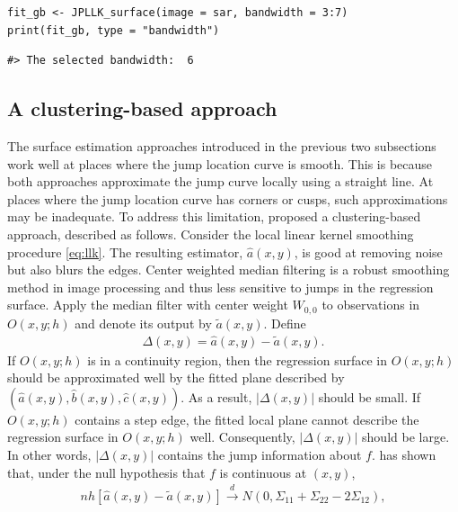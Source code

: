 \begin{verbatim}
fit_gb <- JPLLK_surface(image = sar, bandwidth = 3:7)
print(fit_gb, type = "bandwidth")
\end{verbatim}

\begin{verbatim}
#> The selected bandwidth:  6
\end{verbatim}

\subsection{A clustering-based approach}\label{sec:denoise.cluster}

The surface estimation approaches introduced in the previous two subsections work well at places where the jump location curve is smooth. This is because both approaches approximate the jump curve locally using a straight line. At places where the jump location curve has corners or cusps, such approximations may be inadequate. To address this limitation, \citet{kang2018efficient} proposed a clustering-based approach, described as follows. Consider the local linear kernel smoothing procedure \eqref{eq:llk}. The resulting estimator, \(\widehat{a}(x, y)\), is good at removing noise but also blurs the edges. Center weighted median filtering \citep{ko1991center, sun1994center} is a robust smoothing method in image processing and thus less sensitive to jumps in the regression surface. Apply the median filter with center weight \(W_{0, 0}\) to observations in \(O(x, y; h)\) and denote its output by \(\tilde{a}(x, y)\). Define
\begin{align*}
  \Delta(x, y) = \widehat{a}(x, y) - \tilde{a}(x, y).
\end{align*}
If \(O(x, y; h)\) is in a continuity region, then the regression surface in \(O(x, y; h)\) should be approximated well by the fitted plane described by \((\widehat{a}(x, y), \widehat{b}(x, y), \widehat{c}(x, y))\). As a result, \(| \Delta(x, y) |\) should be small. If \(O(x, y; h)\) contains a step edge, the fitted local plane cannot describe the regression surface in \(O(x, y; h)\) well. Consequently, \(| \Delta(x, y) |\) should be large. In other words, \(| \Delta(x, y) |\) contains the jump information about \(f\). \citet{kang2018efficient} has shown that, under the null hypothesis that \(f\) is continuous at \((x, y)\),
\begin{align*}
  n h\left[ \widehat{a}(x, y) - \tilde{a}(x, y) \right] \stackrel{d}{\rightarrow} N(0, \Sigma_{11} + \Sigma_{22} - 2\Sigma_{12}),
\end{align*}
